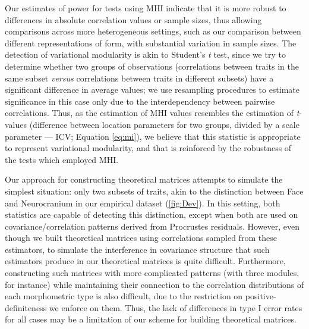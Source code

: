 \documentclass[12pt,twoside]{report}
\begin{document}
Our estimates of power for tests using MHI indicate that it is more
robust to differences in absolute correlation values or sample sizes,
thus allowing comparisons across more heterogeneous settings, such as
our comparison between different representations of form, with
substantial variation in sample sizes. The detection of variational
modularity is akin to Student's \emph{t} test, since we try to determine
whether two groups of observations (correlations between traits in the
same subset \emph{versus} correlations between traits in different
subsets) have a significant difference in average values; we use
resampling procedures to estimate significance in this case only due to
the interdependency between pairwise correlations. Thus, as the
estimation of MHI values resembles the estimation of \emph{t}-values
(difference between location parameters for two groups, divided by a
scale parameter --- ICV; Equation \ref{eq:mi}), we believe that this
statistic is appropriate to represent variational modularity, and that
is reinforced by the robustness of the tests which employed MHI.

Our approach for constructing theoretical matrices attempts to simulate
the simplest situation: only two subsets of traits, akin to the
distinction between Face and Neurocranium in our empirical dataset
(\autoref{fig:Dev}). In this setting, both statistics are capable of
detecting this distinction, except when both are used on
covariance/correlation patterns derived from Procrustes residuals.
However, even though we built theoretical matrices using correlations
sampled from these estimators, to simulate the interference in
covariance structure that such estimators produce in our theoretical
matrices is quite difficult. Furthermore, constructing such matrices
with more complicated patterns (with three modules, for instance) while
maintaining their connection to the correlation distributions of each
morphometric type is also difficult, due to the restriction on
positive-definiteness we enforce on them. Thus, the lack of differences
in type I error rates for all cases may be a limitation of our scheme
for building theoretical matrices.
\end{document}
